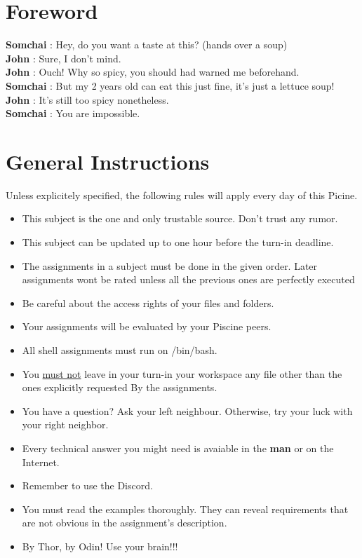 \documentclass[12pt, a4paper]{report}
\begin{document}
\newpage

\chapter{Foreword}
	\normalsize \textbf{Somchai} : Hey, do you want a taste at this? (hands over a soup)\vspace{.2cm}\\
	\textbf{John} : Sure, I don't mind.\vspace{.2cm}\\
	\textbf{John} : Ouch! Why so spicy, you should had warned me beforehand.\vspace{.2cm}\\
	\textbf{Somchai} : But my 2 years old can eat this just fine, it's just a lettuce soup!\vspace{.2cm}\\
	\textbf{John} : It's still too spicy nonetheless.\vspace{.2cm}\\
	\textbf{Somchai} : You are impossible.

\chapter{General Instructions}
Unless explicitely specified, the following rules will apply every day of this Picine.
	\begin{itemize}
		\item This subject is the one and only trustable source. Don't trust any rumor.
		\item This subject can be updated up to one hour before the turn-in deadline.
		\item The assignments in a subject must be done in the given order. Later assignments
				wont be rated unless all the previous ones are perfectly executed
		\item Be careful about the access rights of your files and folders.
		\item Your assignments will be evaluated by your Piscine peers.
		\item All shell assignments must run on /bin/bash.
		\item You \underline{must not} leave in your turn-in your workspace any file other than the ones
				explicitly requested By the assignments.
		\item You have a question? Ask your left neighbour. Otherwise, try your luck with your
				right neighbor.
		\item Every technical answer you might need is avaiable in the \textbf{man} or on the Internet.
		\item Remember to use the Discord.
		\item You must read the examples thoroughly. They can reveal requirements that are not obvious in
				the assignment's description.
		\item By Thor, by Odin! Use your brain!!!
		\end{itemize}
\end{document}
